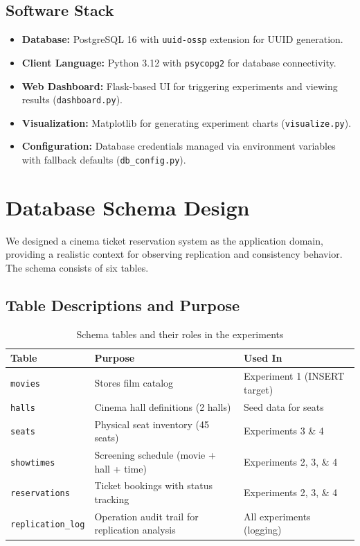 \documentclass[12pt]{article}
\begin{document}
\subsection{Software Stack}
\begin{itemize}
    \item \textbf{Database:} PostgreSQL 16 with \texttt{uuid-ossp} extension for UUID generation.
    \item \textbf{Client Language:} Python 3.12 with \texttt{psycopg2} for database connectivity.
    \item \textbf{Web Dashboard:} Flask-based UI for triggering experiments and viewing results (\texttt{dashboard.py}).
    \item \textbf{Visualization:} Matplotlib for generating experiment charts (\texttt{visualize.py}).
    \item \textbf{Configuration:} Database credentials managed via environment variables with fallback defaults (\texttt{db\_config.py}).
\end{itemize}

\section{Database Schema Design}

We designed a cinema ticket reservation system as the application domain, providing a realistic context for observing replication and consistency behavior. The schema consists of six tables.

\subsection{Table Descriptions and Purpose}

\begin{table}[H]
\centering
\small
\begin{tabular}{p{3cm} p{5.5cm} p{5cm}}
\toprule
\textbf{Table} & \textbf{Purpose} & \textbf{Used In} \\
\midrule
\texttt{movies} & Stores film catalog & Experiment 1 (INSERT target) \\
\texttt{halls} & Cinema hall definitions (2 halls) & Seed data for seats \\
\texttt{seats} & Physical seat inventory (45 seats) & Experiments 3 \& 4 \\
\texttt{showtimes} & Screening schedule (movie + hall + time) & Experiments 2, 3, \& 4 \\
\texttt{reservations} & Ticket bookings with status tracking & Experiments 2, 3, \& 4 \\
\texttt{replication\_log} & Operation audit trail for replication analysis & All experiments (logging) \\
\bottomrule
\end{tabular}
\caption{Schema tables and their roles in the experiments}
\label{tab:tables}
\end{table}
\end{document}
